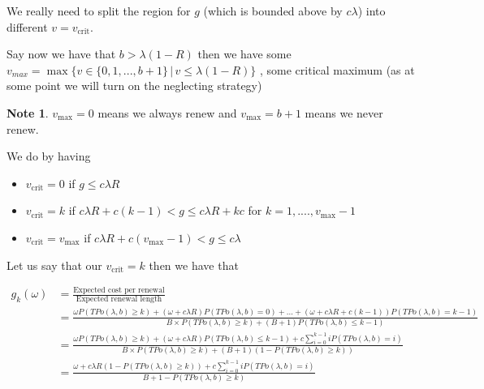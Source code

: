 \documentclass[a4paper,10pt]{article}
\theoremstyle{definition}
\theoremstyle{definition}
\theoremstyle{remark}
\theoremstyle{definition}
\newtheorem*{note}{Note}
\begin{document}
We really need to split the region for $g$ (which is bounded above by $c \lambda$) into different $v=v_{\text{crit}}$.

Say now we have that $b > \lambda (1-R) $ then we have some $v_{max}=\max \{ v \in \{ 0,1,...,b+1 \} \, | \, v \leq \lambda (1-R) \}$ , some critical maximum (as at some point we will turn on the neglecting strategy)

\begin{note}
$v_{\text{max}}=0$ means we always renew and $v_{\text{max}}=b+1$ means we never renew.
\end{note}

We do by having
\begin{itemize}
\item $v_{\text{crit}}=0$ if $g \leq c \lambda R$
\item $v_{\text{crit}}=k$ if $c \lambda R +c(k-1) < g \leq c \lambda R + kc$ for $k=1,....,v_{\text{max}}-1$
\item $v_{\text{crit}}=v_{\text{max}}$ if $c \lambda R + c(v_{\text{max}}-1) < g \leq c \lambda$
\end{itemize}

Let us say that our $v_{\text{crit}}=k$ then we have that

\begin{align*}
g_{k}(\omega)&=\frac{\text{Expected cost per renewal}}{\text{Expected renewal length}} \\
&= \frac{\omega P(TPo(\lambda,b) \geq k) + (\omega + c \lambda R) P(TPo(\lambda,b)=0)+...+(\omega + c \lambda R + c(k-1)) P(TPo(\lambda,b)=k-1)}{B \times P(TPo(\lambda,b) \geq k) + (B+1)P(TPo(\lambda,b) \leq k-1)} \\
&=\frac{\omega P(TPo(\lambda,b) \geq k) + (\omega + c \lambda R )P(TPo(\lambda,b) \leq k-1) + c \sum\limits_{i=0}^{k-1} i P(TPo(\lambda,b)=i)}{B \times P(TPo(\lambda,b) \geq k) + (B+1)(1-P(TPo(\lambda,b) \geq k))} \\
&= \frac{\omega + c \lambda R (1-P(TPo(\lambda,b) \geq k)) + c \sum\limits_{i=0}^{k-1} i P(TPo(\lambda,b)=i)}{B+1-P(TPo(\lambda,b) \geq k)}
\end{align*}

\begin{myfigure}
\begin{center}
\resizebox{.6\textwidth}{!}{
}
\end{center}
\caption{This shows the best long-run average cost (as a choice of $k$ for each $\omega$) Note. Figure needs checking against new formula (using B instead of floor(B)}
\end{myfigure}
\end{document}
